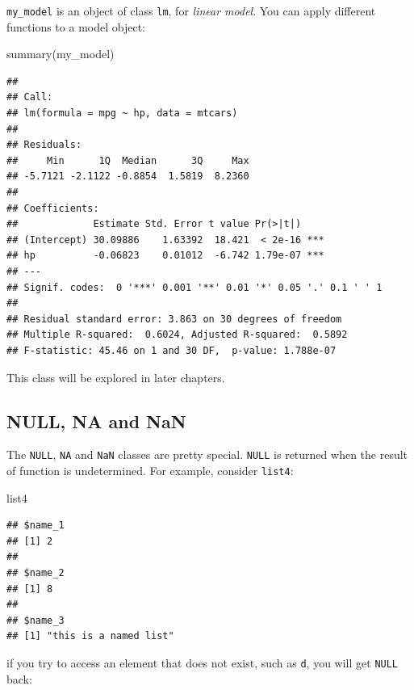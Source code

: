 \documentclass[
]{article}
\newenvironment{Shaded}{\begin{snugshade}}{\end{snugshade}}
\newcommand{\FunctionTok}[1]{\textcolor[rgb]{0.00,0.00,0.00}{#1}}
\newcommand{\NormalTok}[1]{#1}
\newcommand{\SpecialCharTok}[1]{\textcolor[rgb]{0.00,0.00,0.00}{#1}}
\begin{document}
\texttt{my\_model} is an object of class \texttt{lm}, for \emph{linear model}. You can apply different functions to a model object:

\begin{Shaded}
\begin{Highlighting}[]
\FunctionTok{summary}\NormalTok{(my\_model)}
\end{Highlighting}
\end{Shaded}

\begin{verbatim}
## 
## Call:
## lm(formula = mpg ~ hp, data = mtcars)
## 
## Residuals:
##     Min      1Q  Median      3Q     Max 
## -5.7121 -2.1122 -0.8854  1.5819  8.2360 
## 
## Coefficients:
##             Estimate Std. Error t value Pr(>|t|)    
## (Intercept) 30.09886    1.63392  18.421  < 2e-16 ***
## hp          -0.06823    0.01012  -6.742 1.79e-07 ***
## ---
## Signif. codes:  0 '***' 0.001 '**' 0.01 '*' 0.05 '.' 0.1 ' ' 1
## 
## Residual standard error: 3.863 on 30 degrees of freedom
## Multiple R-squared:  0.6024, Adjusted R-squared:  0.5892 
## F-statistic: 45.46 on 1 and 30 DF,  p-value: 1.788e-07
\end{verbatim}

This class will be explored in later chapters.

\hypertarget{null-na-and-nan}{%
\subsection{NULL, NA and NaN}\label{null-na-and-nan}}

The \texttt{NULL}, \texttt{NA} and \texttt{NaN} classes are pretty special. \texttt{NULL} is returned when the result of function is undetermined.
For example, consider \texttt{list4}:

\begin{Shaded}
\begin{Highlighting}[]
\NormalTok{list4}
\end{Highlighting}
\end{Shaded}

\begin{verbatim}
## $name_1
## [1] 2
## 
## $name_2
## [1] 8
## 
## $name_3
## [1] "this is a named list"
\end{verbatim}

if you try to access an element that does not exist, such as \texttt{d}, you will get \texttt{NULL} back:

\begin{Shaded}
\end{Shaded}
\end{document}
